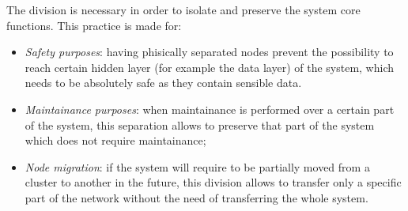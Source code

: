 The division is necessary in order to isolate and preserve the system core functions. This practice is made for:
\begin{itemize}
    \item \textit{Safety purposes}: having phisically separated nodes prevent the possibility to reach certain hidden layer (for example the data layer) of the system, which needs to be absolutely safe as they contain sensible data.
    \item \textit{Maintainance purposes}: when maintainance is performed over a certain part of the system, this separation allows to preserve that part of the system which does not require maintainance;
    \item \textit{Node migration}: if the system will require to be partially moved from a cluster to another in the future, this division allows to transfer only a specific part of the network without the need of transferring the whole system.
\end{itemize}